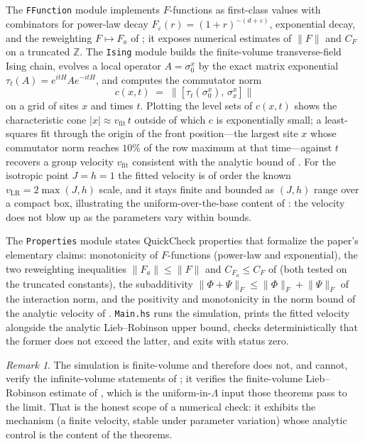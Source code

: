 \documentclass[12pt]{article}
\newcommand{\Ffun}{F}                          %
\newcommand{\norm}[1]{\lVert #1\rVert}
\newcommand{\Fnorm}[1]{\lVert #1\rVert_{F}}
\newcommand{\Z}{\mathbb{Z}}
\theoremstyle{definition}
\theoremstyle{remark}
\newtheorem{remark}[theorem]{Remark}
\begin{document}
The \texttt{FFunction} module implements $\Ffun$-functions as first-class values with
combinators for power-law decay $\Ffun_\varepsilon(r)=(1+r)^{-(d+\varepsilon)}$, exponential
decay, and the reweighting $\Ffun\mapsto\Ffun_a$ of ; it exposes numerical
estimates of $\norm{\Ffun}$ and $C_\Ffun$ on a truncated $\Z$. The \texttt{Ising} module
builds the finite-volume transverse-field Ising chain, evolves a local operator $A=\sigma^x_0$
by the exact matrix exponential $\tau_t(A)=e^{itH}Ae^{-itH}$, and computes the commutator norm
\[
  c(x,t)\;=\;\bigl\lVert[\tau_t(\sigma^x_0),\,\sigma^x_x]\bigr\rVert
\]
on a grid of sites $x$ and times $t$. Plotting the level sets of $c(x,t)$ shows the
characteristic cone $\lvert x\rvert\approx v_{\mathrm{fit}}\,t$ outside of which $c$ is
exponentially small; a least-squares fit through the origin of the front position---the
largest site $x$ whose commutator norm reaches $10\%$ of the row maximum at that time---against
$t$ recovers a group velocity $v_{\mathrm{fit}}$ consistent with the analytic bound of
. For
the isotropic point $J=h=1$ the fitted velocity is of order the known
$v_{\mathrm{LR}}=2\max(J,h)$ scale, and it stays finite and bounded as $(J,h)$ range over a
compact box, illustrating the uniform-over-the-base content of : the
velocity does not blow up as the parameters vary within bounds.

The \texttt{Properties} module states QuickCheck properties that formalize the paper's
elementary claims: monotonicity of $\Ffun$-functions (power-law and exponential), the two
reweighting inequalities $\norm{\Ffun_a}\le\norm{\Ffun}$ and $C_{\Ffun_a}\le C_\Ffun$ of
 (both tested on the truncated constants), the subadditivity
$\Fnorm{\Phi+\Psi}\le\Fnorm{\Phi}+\Fnorm{\Psi}$ of the interaction norm, and the positivity and
monotonicity in the norm bound of the analytic velocity of .
\texttt{Main.hs} runs the simulation, prints the fitted velocity alongside the analytic
Lieb--Robinson upper bound, checks deterministically that the former does not exceed the
latter, and exits with status zero.

\begin{remark}
The simulation is finite-volume and therefore does not, and cannot, verify the infinite-volume
statements of ; it verifies the finite-volume
Lieb--Robinson estimate of , which is the uniform-in-$\Lambda$ input those
theorems pass to the limit. That is the honest scope of a numerical check: it exhibits the
mechanism (a finite velocity, stable under parameter variation) whose analytic control is the
content of the theorems.
\end{remark}
\end{document}
